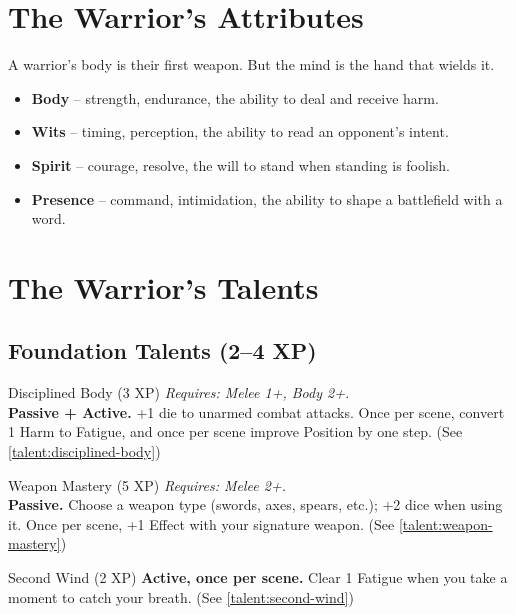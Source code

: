 \documentclass[9pt,a5paper]{extbook}
\begin{document}
\section{The Warrior's Attributes}

A warrior's body is their first weapon. But the mind is the hand that wields it.

\begin{itemize}
    \item \textbf{Body} -- strength, endurance, the ability to deal and receive harm.
    \item \textbf{Wits} -- timing, perception, the ability to read an opponent's intent.
    \item \textbf{Spirit} -- courage, resolve, the will to stand when standing is foolish.
    \item \textbf{Presence} -- command, intimidation, the ability to shape a battlefield with a word.
\end{itemize}

\section{The Warrior's Talents}

\subsection{Foundation Talents (2--4 XP)}

\begin{talentbox}{Disciplined Body (3 XP)}
\textit{Requires: Melee 1+, Body 2+.} \\
\textbf{Passive + Active.} +1 die to unarmed combat attacks. Once per scene, convert 1 Harm to Fatigue, and once per scene improve Position by one step. (See \ref{talent:disciplined-body})
\end{talentbox}

\begin{talentbox}{Weapon Mastery (5 XP)}
\textit{Requires: Melee 2+.} \\
\textbf{Passive.} Choose a weapon type (swords, axes, spears, etc.); +2 dice when using it. Once per scene, +1 Effect with your signature weapon. (See \ref{talent:weapon-mastery})
\end{talentbox}

\begin{talentbox}{Second Wind (2 XP)}
\textbf{Active, once per scene.} Clear 1 Fatigue when you take a moment to catch your breath. (See \ref{talent:second-wind})
\end{talentbox}
\end{document}
